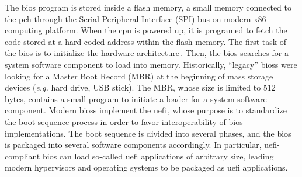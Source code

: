 The \ac{bios} program is stored inside a flash memory, a small memory connected
to the \ac{pch} through the Serial Peripheral Interface (SPI) bus on modern x86
computing platform.
%
When the \ac{cpu} is powered up, it is programed to fetch the code stored at a
hard-coded address within the flash memory.
%
The first task of the \ac{bios} is to initialize the hardware
architecture\,\cite{salihun2006bios}.
%
Then, the \ac{bios} searches for a system software component to load into
memory.
%
Historically, ``legacy'' \acp{bios} were looking for a Master Boot Record (MBR)
at the beginning of mass storage devices (\emph{e.g.} hard drive, USB stick).
%
The MBR, whose size is limited to 512 bytes, contains a small program to
initiate a loader for a system software component.
%
Modern \acp{bios} implement the \ac{uefi}\,\cite{zimmer2007uefi,uefi2017specs},
whose purpose is to standardize the boot sequence process in order to favor
interoperability of \ac{bios} implementations.
%
The boot sequence is divided into several phases, and the \ac{bios} is packaged
into several software components accordingly.
%
In particular, \ac{uefi}-compliant \ac{bios} can load so-called \ac{uefi}
applications of arbitrary size, leading modern hypervisors and operating systems
to be packaged as \ac{uefi} applications.

